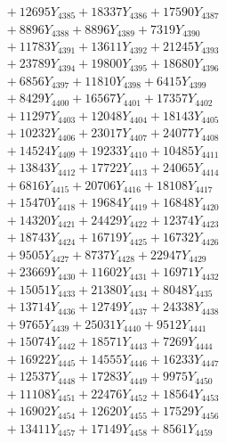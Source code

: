 \documentclass[a4paper,10pt]{article}
\begin{document}
{\begin{align}
&\;  + 12695 Y_{4385} + 18337 Y_{4386} + 17590 Y_{4387} \\[0.3ex]
&\;  + 8896 Y_{4388} + 8896 Y_{4389} + 7319 Y_{4390} \\[0.3ex]
&\;  + 11783 Y_{4391} + 13611 Y_{4392} + 21245 Y_{4393} \\[0.3ex]
&\;  + 23789 Y_{4394} + 19800 Y_{4395} + 18680 Y_{4396} \\[0.3ex]
&\;  + 6856 Y_{4397} + 11810 Y_{4398} + 6415 Y_{4399} \\[0.3ex]
&\;  + 8429 Y_{4400} + 16567 Y_{4401} + 17357 Y_{4402} \\[0.3ex]
&\;  + 11297 Y_{4403} + 12048 Y_{4404} + 18143 Y_{4405} \\[0.3ex]
&\;  + 10232 Y_{4406} + 23017 Y_{4407} + 24077 Y_{4408} \\[0.5ex]\allowbreak
&\;  + 14524 Y_{4409} + 19233 Y_{4410} + 10485 Y_{4411} \\[0.3ex]
&\;  + 13843 Y_{4412} + 17722 Y_{4413} + 24065 Y_{4414} \\[0.3ex]
&\;  + 6816 Y_{4415} + 20706 Y_{4416} + 18108 Y_{4417} \\[0.3ex]
&\;  + 15470 Y_{4418} + 19684 Y_{4419} + 16848 Y_{4420} \\[0.3ex]
&\;  + 14320 Y_{4421} + 24429 Y_{4422} + 12374 Y_{4423} \\[0.3ex]
&\;  + 18743 Y_{4424} + 16719 Y_{4425} + 16732 Y_{4426} \\[0.3ex]
&\;  + 9505 Y_{4427} + 8737 Y_{4428} + 22947 Y_{4429} \\[0.3ex]
&\;  + 23669 Y_{4430} + 11602 Y_{4431} + 16971 Y_{4432} \\[0.3ex]
&\;  + 15051 Y_{4433} + 21380 Y_{4434} + 8048 Y_{4435} \\[0.3ex]
&\;  + 13714 Y_{4436} + 12749 Y_{4437} + 24338 Y_{4438} \\[0.5ex]\allowbreak
&\;  + 9765 Y_{4439} + 25031 Y_{4440} + 9512 Y_{4441} \\[0.3ex]
&\;  + 15074 Y_{4442} + 18571 Y_{4443} + 7269 Y_{4444} \\[0.3ex]
&\;  + 16922 Y_{4445} + 14555 Y_{4446} + 16233 Y_{4447} \\[0.3ex]
&\;  + 12537 Y_{4448} + 17283 Y_{4449} + 9975 Y_{4450} \\[0.3ex]
&\;  + 11108 Y_{4451} + 22476 Y_{4452} + 18564 Y_{4453} \\[0.3ex]
&\;  + 16902 Y_{4454} + 12620 Y_{4455} + 17529 Y_{4456} \\[0.3ex]
&\;  + 13411 Y_{4457} + 17149 Y_{4458} + 8561 Y_{4459} \\[0.3ex]

\end{align}}
\end{document}
